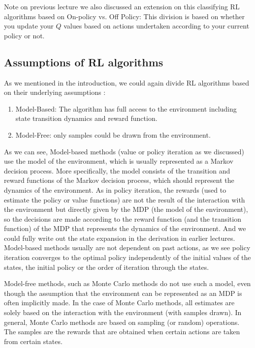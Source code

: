 \documentclass[11pt]{article}
\begin{document}
Note on previous lecture we also discussed an extension on this classifying RL algorithms based on On-policy vs. Off Policy: This division is based on whether you update your $Q$ values based on actions undertaken according to your current policy or not. 

\subsection{Assumptions of RL algorithms}

As we mentioned in the introduction, we could again divide RL algorithms based on their underlying assumptions :
\begin{enumerate}
    \item Model-Based: The algorithm has full access to the environment including state transition dynamics and reward function.
    \item Model-Free: only samples could be drawn from the environment.
\end{enumerate}

As we can see, Model-based methods (value or policy iteration as we discussed) use the model of the environment, which is usually represented as a Markov decision process. More specifically, the model consists of the transition and reward functions of the Markov decision process, which should represent the dynamics of the environment. As in policy iteration, the rewards (used to estimate the policy or value functions) are not the result of the interaction with the environment but directly given by the MDP (the model of the environment), so the decisions are made according to the reward function (and the transition function) of the MDP that represents the dynamics of the environment. And we could fully write out the state expansion in the derivation in earlier lectures. Model-based methods usually are not dependent on past actions, as we see policy iteration converges to the optimal policy independently of the initial values of the states, the initial policy or the order of iteration through the states.

Model-free methods, such as Monte Carlo methods do not use such a model, even though the assumption that the environment can be represented as an MDP is often implicitly made. In the case of Monte Carlo methods, all estimates are solely based on the interaction with the environment (with samples drawn). In general, Monte Carlo methods are based on sampling (or random) operations. The samples are the rewards that are obtained when certain actions are taken from certain states.
\end{document}
